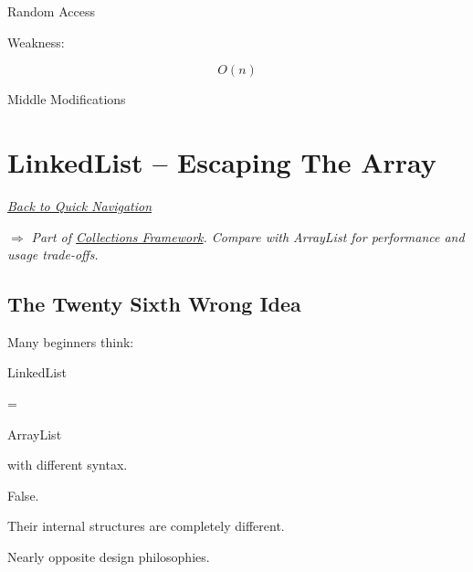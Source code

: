 \documentclass[11pt,a4paper]{book}
\begin{document}
Random Access


Weakness:

\[
O(n)
\]

Middle Modifications

\chapter{LinkedList -- Escaping The Array}

\smallskip
\noindent
\hyperref[sec:quick_nav]{\emph{Back to Quick Navigation}}

\smallskip
\noindent
\textcolor{RosettaRoyalPurple}{$\Rightarrow$}
\emph{Part of \hyperref[chap:collections]{Collections Framework}. Compare with ArrayList for performance and usage trade-offs.}


\section{The Twenty Sixth Wrong Idea}

\begin{trap}

Many beginners think:


LinkedList

=

ArrayList


with different syntax.


False.


Their internal structures are
completely different.


Nearly opposite design philosophies.

\end{trap}

\end{document}
